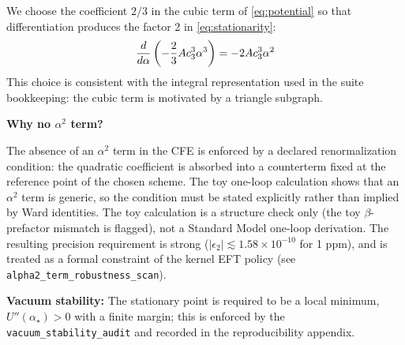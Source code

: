 We choose the coefficient $2/3$ in the cubic term of \eqref{eq:potential} so that
differentiation produces the factor 2 in \eqref{eq:stationarity}:
\begin{equation}
    \frac{d}{d\alpha}\left(-\frac{2}{3}Ac_3^3\alpha^3\right) = -2Ac_3^3\alpha^2
\end{equation}
This choice is consistent with the integral representation used in the suite
bookkeeping: the cubic term is motivated by a triangle subgraph.

\textbf{Why no $\alpha^2$ term?}

The absence of an $\alpha^2$ term in the CFE is enforced by a declared renormalization
condition: the quadratic coefficient is absorbed into a counterterm fixed at the reference
point of the chosen scheme. The toy one-loop calculation shows that an $\alpha^2$ term is
generic, so the condition must be stated explicitly rather than implied by Ward identities.
The toy calculation is a structure check only (the toy $\beta$-prefactor mismatch is flagged),
not a Standard Model one-loop derivation. The resulting precision requirement is strong
($|\epsilon_2|\lesssim 1.58\times 10^{-10}$ for 1 ppm), and is treated as a formal constraint
of the kernel EFT policy (see \texttt{alpha2\_term\_robustness\_scan}).

\textbf{Vacuum stability:} The stationary point is required to be a local minimum,
$U''(\alpha_\star)>0$ with a finite margin; this is enforced by the
\texttt{vacuum\_stability\_audit} and recorded in the reproducibility appendix.

